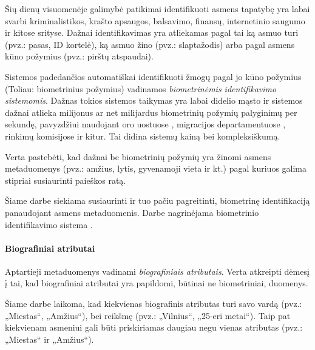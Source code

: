

Šių dienų visuomenėje galimybė patikimai identifikuoti asmens tapatybę yra labai svarbi kriminalistikos, krašto apsaugos, balsavimo, finansų, internetinio saugumo ir kitose srityse.
Dažnai identifikavimas yra atliekamas pagal tai ką asmuo turi (pvz.: pasas, ID kortelė), ką asmuo žino (pvz.: slaptažodis) arba pagal asmens kūno požymius (pvz.: pirštų atspaudai).

Sistemos padedančios automatiškai identifikuoti žmogų pagal jo kūno požymius (Toliau: biometrinius požymius) vadinamos {\it biometrinėmis identifikavimo sistemomis}.
Dažnas tokios sistemos taikymas yra labai didelio mąsto ir sistemos dažnai atlieka milijonus ar net milijardus biometrinių požymių palyginimų per sekundę, pavyzdžiui naudojant oro uostuose \cite{ForbesAirportBiometrics}, migracijos departamentuose \cite{NeurotechnologySomaliNationalId}, rinkimų komisijose \cite{NeurotechnologyDRCDedublicationProject} \cite{NeurotechnologyVenezuelaDedublicationProject} ir kitur.
Tai didina sistemų kainą bei kompleksiškumą.

Verta pastebėti, kad dažnai be biometrinių požymių yra žinomi asmens metaduomenys (pvz.: amžius, lytis, gyvenamoji vieta ir kt.) pagal kuriuos galima stipriai susiaurinti paieškos ratą.

Šiame darbe siekiama susiaurinti ir tuo pačiu pagreitinti, biometrinę identifikaciją panaudojant asmens metaduomenis.
Darbe nagrinėjama biometrinio identifikavimo sistema \cite{NeurotechnologyMegamatcherAccelerator}.


\paragraph{Biografiniai atributai}

Aptartieji metaduomenys vadinami {\it biografiniais atributais}.
Verta atkreipti dėmesį į tai, kad biografiniai atributai yra papildomi, būtinai ne biometriniai, duomenys.

Šiame darbe laikoma, kad kiekvienas biografinis atributas turi savo vardą (pvz.: „Miestas“, „Amžius“), bei reikšmę (pvz.: „Vilnius“, „25-eri metai“).
Taip pat kiekvienam asmeniui gali būti priskiriamas daugiau negu vienas atributas (pvz.: „Miestas“ ir „Amžius“).

